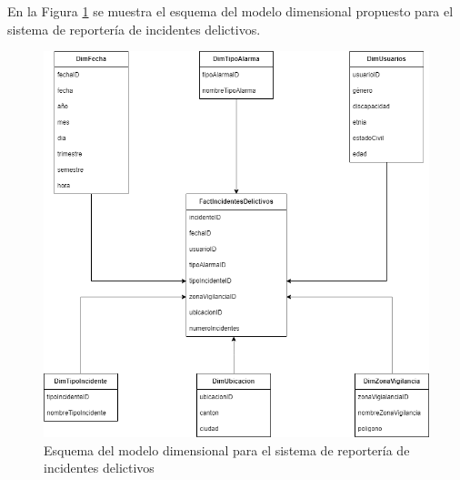 En la Figura \ref{fig:esquema-modelo-dimensional} se muestra el esquema del modelo dimensional propuesto para el sistema de reportería de incidentes delictivos.

\begin{figure}[H]
    \centering
    \includegraphics[width=1\textwidth]{chapters/III-resultados-y-discusion/resources/images/esquema-modelo-dimensional.png}
    \caption{Esquema del modelo dimensional para el sistema de reportería de incidentes delictivos}
    \label{fig:esquema-modelo-dimensional}
\end{figure}